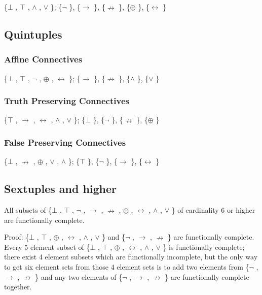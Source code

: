 \{$\bot$ , $\top$ , $\land$ , $\lor$ \}; \{$\neg$ \}, \{$\to$ \}, \{$\nrightarrow$ \}, \{$\oplus$ \}, \{$\leftrightarrow$ \}

\hypertarget{quintuples}{%
\subsection{Quintuples}\label{quintuples}}

\hypertarget{affine-connectives-2}{%
\subsubsection{Affine Connectives}\label{affine-connectives-2}}

\{$\bot$ , $\top$ , $\neg$ , $\oplus$ , $\leftrightarrow$ \}; \{$\to$ \}, \{$\nrightarrow$ \}, \{$\land$ \}, \{$\lor$ \}

\hypertarget{truth-preserving-connectives-2}{%
\subsubsection{Truth Preserving
Connectives}\label{truth-preserving-connectives-2}}

\{$\top$ , $\to$ , $\leftrightarrow$ , $\land$ , $\lor$ \}; \{$\bot$ \}, \{$\neg$ \}, \{$\nrightarrow$ \}, \{$\oplus$ \}

\hypertarget{false-preserving-connectives-2}{%
\subsubsection{False Preserving
Connectives}\label{false-preserving-connectives-2}}

\{$\bot$ , $\nrightarrow$ , $\oplus$ , $\lor$ , $\land$ \}; \{$\top$ \}, \{$\neg$ \}, \{$\to$ \}, \{$\leftrightarrow$ \}

\hypertarget{sextuples-and-higher}{%
\subsection{Sextuples and higher}\label{sextuples-and-higher}}

All subsets of \{$\bot$ , $\top$ , $\neg$ , $\to$ , $\nrightarrow$ , $\oplus$ , $\leftrightarrow$ , $\land$ , $\lor$ \} of cardinality 6 or higher
are functionally complete.

Proof: \{$\bot$ , $\top$ , $\oplus$ , $\leftrightarrow$ , $\land$ , $\lor$ \} and \{$\neg$ , $\to$ , $\nrightarrow$ \} are functionally complete.
Every 5 element subset of \{$\bot$ , $\top$ , $\oplus$ , $\leftrightarrow$ , $\land$ , $\lor$ \} is functionally complete;
there exist 4 element subsets which are functionally incomplete, but the
only way to get six element sets from those 4 element sets is to add two
elements from \{$\neg$ , $\to$ , $\nrightarrow$ \} and any two elements of \{$\neg$ , $\to$ , $\nrightarrow$ \} are
functionally complete together.

